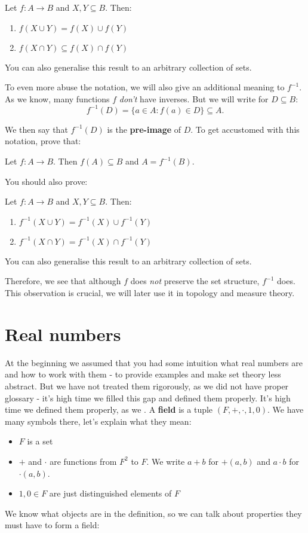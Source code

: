 \begin{prob}
  Let $f:A\to B$ and $X,Y\subseteq B$. Then:
  \begin{enumerate}
    \item $f(X\cup Y)=f(X)\cup f(Y)$
    \item $f(X\cap Y)\subseteq f(X)\cap f(Y)$
  \end{enumerate}
  You can also generalise this result to an arbitrary collection of
  sets.
\end{prob}

\noindent To even more abuse the notation, we will also give an additional meaning to $f^{-1}$. As we know, many functions $f$ \textit{don't} have inverses. But we will write for $D\subseteq B$:
$$f^{-1}(D) = \{a \in A : f(a)\in D\}\subseteq A.$$

We then say that $f^{-1}(D)$ is the \textbf{pre-image} of $D$.
To get accustomed with this notation, prove that:

\begin{prob}
  Let $f:A\to B$. Then $f(A)\subseteq B$ and $A=f^{-1}(B)$.
\end{prob}

You should also prove:
\begin{prob}
  Let $f:A\to B$ and $X,Y\subseteq B$. Then:
  \begin{enumerate}
    \item $f^{-1}(X\cup Y)=f^{-1}(X)\cup f^{-1}(Y)$
    \item $f^{-1}(X\cap Y)=f^{-1}(X)\cap f^{-1}(Y)$
  \end{enumerate}
  You can also generalise this result to an arbitrary collection of
  sets.
\end{prob}
Therefore, we see that although $f$ does \textit{not} preserve the
set structure, $f^{-1}$ does. This observation is crucial, we will later use it in topology and measure theory.

\section{Real numbers}
At the beginning we assumed that you had some intuition what real numbers
are and how to work with them - to provide examples and make set theory less
abstract. But we have not treated them rigorously, as we did not have proper
glossary - it's high time we filled this gap and defined them properly.
It's high time we defined them properly, as we .
A \textbf{field} is a tuple $(F, +, \cdot, 1, 0).$ We have
many symbols there, let's explain what they mean:
\begin{itemize}
  \item $F$ is a set
  \item $+$ and $\cdot$ are functions from $F^2$ to $F$. We write
    $a+b$ for $+(a,b)$ and $a\cdot b$ for $\cdot (a,b)$.
  \item $1, 0\in F$ are just distinguished elements of $F$
\end{itemize}
We know what objects are in the definition, so we can talk about
properties they must have to form a field:

